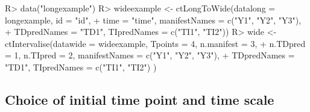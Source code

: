\documentclass[nojss]{jss}\usepackage[]{graphicx}\usepackage[]{color}
\begin{document}
\begin{Schunk}
\begin{Sinput}
R> data("longexample")
R> wideexample <- ctLongToWide(datalong = longexample, id = "id", 
+   time = "time", manifestNames = c("Y1", "Y2", "Y3"), 
+   TDpredNames = "TD1", TIpredNames = c("TI1", "TI2"))
R> wide <- ctIntervalise(datawide = wideexample, Tpoints = 4, n.manifest = 3, 
+   n.TDpred = 1, n.TIpred = 2, manifestNames = c("Y1", "Y2", "Y3"), 
+   TDpredNames = "TD1", TIpredNames = c("TI1", "TI2") )
\end{Sinput}
\end{Schunk}

\subsection{Choice of initial time point and time scale} \label{sec:datatimescale}\nopagebreak
\end{document}
